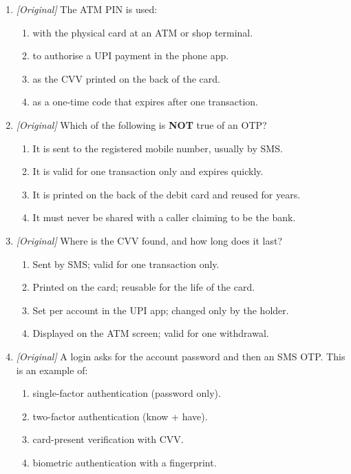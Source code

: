 \documentclass[11pt]{article}
\begin{document}
\begin{enumerate}[label=\textbf{Q\arabic*.}, leftmargin=*]
\item \textit{[Original]} The ATM PIN is used:
  \begin{enumerate}[label=\Alph*.]
    \item with the physical card at an ATM or shop terminal.
    \item to authorise a UPI payment in the phone app.
    \item as the CVV printed on the back of the card.
    \item as a one-time code that expires after one transaction.
  \end{enumerate}
\item \textit{[Original]} Which of the following is \textbf{NOT} true of an
  OTP?
  \begin{enumerate}[label=\Alph*.]
    \item It is sent to the registered mobile number, usually by SMS.
    \item It is valid for one transaction only and expires quickly.
    \item It is printed on the back of the debit card and reused for years.
    \item It must never be shared with a caller claiming to be the bank.
  \end{enumerate}
\item \textit{[Original]} Where is the CVV found, and how long does it last?
  \begin{enumerate}[label=\Alph*.]
    \item Sent by SMS; valid for one transaction only.
    \item Printed on the card; reusable for the life of the card.
    \item Set per account in the UPI app; changed only by the holder.
    \item Displayed on the ATM screen; valid for one withdrawal.
  \end{enumerate}
\item \textit{[Original]} A login asks for the account password and then an
  SMS OTP. This is an example of:
  \begin{enumerate}[label=\Alph*.]
    \item single-factor authentication (password only).
    \item two-factor authentication (know + have).
    \item card-present verification with CVV.
    \item biometric authentication with a fingerprint.
  \end{enumerate}

\end{enumerate}
\end{document}

